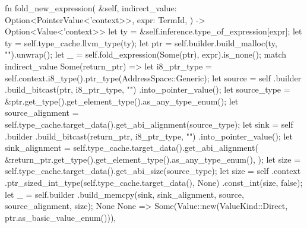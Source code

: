 \documentclass[
  oneside,
  english,
  coorientadorbanca,
  noabntexcite
]{ufsc-thesis-rn46-2019}
\begin{document}
\begin{rustcode}
{    fn fold_new_expression(
        &self,
        indirect_value: Option<PointerValue<'context>>,
        expr: TermId,
    ) -> Option<Value<'context>> {
        let ty = &self.inference.type_of_expression[expr];
        let ty = self.type_cache.llvm_type(ty);
        let ptr = self.builder.build_malloc(ty, "").unwrap();
        let _ = self.fold_expression(Some(ptr), expr).is_none();
        match indirect_value {
            Some(return_ptr) => {
                let i8_ptr_type = self.context.i8_type().ptr_type(AddressSpace::Generic);
                let source = self
                    .builder
                    .build_bitcast(ptr, i8_ptr_type, "")
                    .into_pointer_value();
                let source_type = &ptr.get_type().get_element_type().as_any_type_enum();
                let source_alignment = self.type_cache.target_data().get_abi_alignment(source_type);
                let sink = self
                    .builder
                    .build_bitcast(return_ptr, i8_ptr_type, "")
                    .into_pointer_value();
                let sink_alignment = self.type_cache.target_data().get_abi_alignment(
                    &return_ptr.get_type().get_element_type().as_any_type_enum(),
                );
                let size = self.type_cache.target_data().get_abi_size(source_type);
                let size = self
                    .context
                    .ptr_sized_int_type(self.type_cache.target_data(), None)
                    .const_int(size, false);
                let _ =
                    self.builder
                        .build_memcpy(sink, sink_alignment, source, source_alignment, size);
                None
            }
            None => Some(Value::new(ValueKind::Direct, ptr.as_basic_value_enum())),
        }
    }
}
\end{rustcode}



\postextual{}

\printbibliography{}
\end{document}
